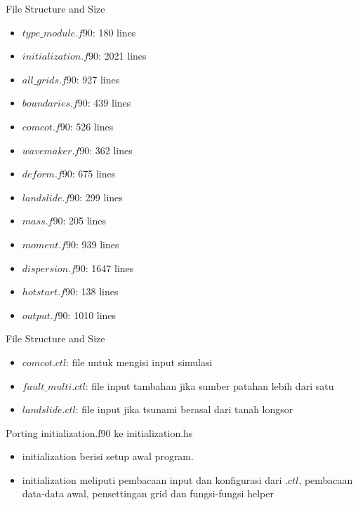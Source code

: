 \documentclass{beamer}
\begin{document}
\begin{frame}{File Structure and Size}
    \begin{itemize}
        \item $type\_module.f90$: 180 lines
        \item $initialization.f90$: 2021 lines
        \item $all\_grids.f90$: 927 lines
        \item $boundaries.f90$: 439 lines
        \item $comcot.f90$: 526 lines
        \item $wavemaker.f90$: 362 lines
        \item $deform.f90$: 675 lines
        \item $landslide.f90$: 299 lines
        \item $mass.f90$: 205 lines
        \item $moment.f90$: 939 lines
        \item $dispersion.f90$: 1647 lines
        \item $hotstart.f90$: 138 lines
        \item $output.f90$: 1010 lines
    \end{itemize}
\end{frame}

\begin{frame}{File Structure and Size}
    \begin{itemize}
        \item $comcot.ctl$: file untuk mengisi input simulasi
        \item $fault\_multi.ctl$: file input tambahan jika sumber patahan lebih dari satu
        \item $landslide.ctl$: file input jika tsunami berasal dari tanah longsor
    \end{itemize}
\end{frame}

\begin{frame}{Porting initialization.f90 ke initialization.hs}
    \begin{itemize}
        \item initialization berisi setup awal program.
        \item initialization meliputi pembacaan input dan konfigurasi dari $.ctl$, 
        pembacaan data-data awal, pensettingan grid dan fungsi-fungsi helper
    \end{itemize}
\end{frame}
\end{document}
